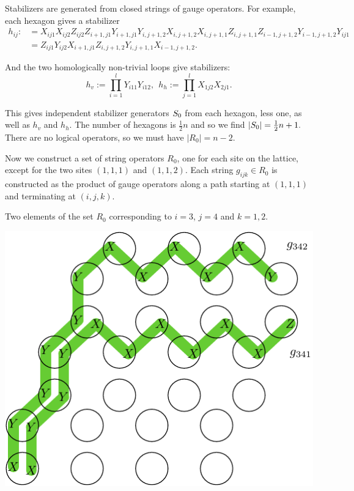 Stabilizers are generated from closed strings of
gauge operators. 
For example, each hexagon gives a stabilizer
\begin{align*}
h_{ij}:&= 
X_{ij1}X_{ij2}
Z_{ij2}Z_{i+1,j1}
Y_{i+1,j1}Y_{i,j+1,2}
X_{i,j+1,2}X_{i,j+1,1}
Z_{i,j+1,1}Z_{i-1,j+1,2}
Y_{i-1,j+1,2}Y_{ij1}
\\
&= 
Z_{ij1} Y_{ij2} X_{i+1,j1}
Z_{i,j+1,2} Y_{i,j+1,1} X_{i-1,j+1,2}.
\end{align*}

And the two homologically non-trivial loops
give stabilizers:
$$
h_v := \prod_{i=1}^l Y_{i11} Y_{i12},\ \ 
h_h := \prod_{j=1}^l X_{1j2} X_{2j1}.
$$

This gives independent stabilizer generators $S_0$
from each hexagon, less one, as well as $h_v$ and $h_h.$
The number of hexagons is $\frac{1}{2}n$ and
so we find $|S_0|=\frac{1}{2} n+1.$
There are no logical operators, so we
must have $|R_0|=n-2.$


Now we construct a set of string operators $R_0$,
one for each site on the lattice, except for
the two sites $(1,1,1)$ and $(1,1,2).$
Each string $g_{ijk}\in R_0$
is constructed as the product of
gauge operators along a path starting at
$(1,1,1)$ and terminating at $(i,j,k).$

Two elements of the set $R_0$ corresponding
to $i=3$, $j=4$ and $k=1,2.$
\begin{center}
\includegraphics[width=0.5\columnwidth]{fig_01.pdf}
\end{center}

